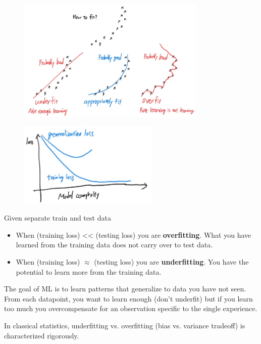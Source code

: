 \begin{definition}
    \begin{figure}[H]
        \centering
        \includegraphics[width=0.8\textwidth]{.././assets/6.2.jpg}
    \end{figure}

    \begin{figure}[H]
        \centering
        \includegraphics[width=0.6\textwidth]{.././assets/6.3.png}
    \end{figure}

    Given separate train and test data

    \begin{itemize}
        \item When (training loss) << (testing loss) you are \textbf{overfitting}. What you have learned from the training data does not carry over to test data.
        \item When (training loss) $\approx$ (testing loss) you are \textbf{underfitting}. You have the potential to learn more from the training data.
    \end{itemize}

    \par\noindent\textcolor{gray}{\hdashrule{\textwidth}{0.4pt}{1pt 2pt}}

    The goal of ML is to learn patterns that generalize to data you have not seen. From each datapoint, you want to learn enough (don't underfit) but if you learn too much you overcompensate for an observation specific to the single experience.

    In classical statistics, underfitting vs. overfitting (bias vs. variance tradeoff) is characterized rigorously.
\end{definition}


